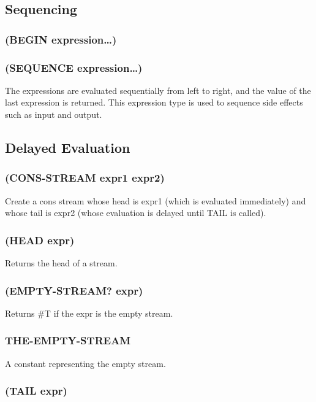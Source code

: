 \documentclass[11pt]{article}
\begin{document}
\subsection{Sequencing}
\label{sec-4-7}

\subsubsection{(BEGIN expression\ldots{})}
\label{sec-4-7-1}
\subsubsection{(SEQUENCE expression\ldots{})}
\label{sec-4-7-2}

The expressions are evaluated sequentially from left to right, and
the value of the last expression is returned.  This expression type
is used to sequence side effects such as input and output.
\subsection{Delayed Evaluation}
\label{sec-4-8}

\subsubsection{(CONS-STREAM expr1 expr2)}
\label{sec-4-8-1}

Create a cons stream whose head is expr1 (which is evaluated
immediately) and whose tail is expr2 (whose evaluation is delayed
until TAIL is called).
\subsubsection{(HEAD expr)}
\label{sec-4-8-2}

Returns the head of a stream.
\subsubsection{(EMPTY-STREAM? expr)}
\label{sec-4-8-3}

Returns \#T if the expr is the empty stream.
\subsubsection{THE-EMPTY-STREAM}
\label{sec-4-8-4}

A constant representing the empty stream.
\subsubsection{(TAIL expr)}
\label{sec-4-8-5}
\end{document}
